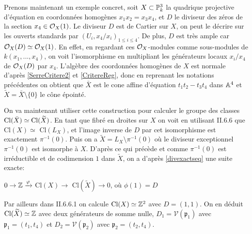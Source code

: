 Prenons maintenant un exemple concret, soit $X\subset \mathbb{P}^3_k$ la quadrique projective d'équation en coordonnées homogènes $x_1x_2=x_3x_4$, et $D$ le diviseur des zéros de la section $x_4\in\mathcal{O}_X(1)$. Le diviseur $D$ est de Cartier sur $X$, on peut le décrire sur les ouverts standards par $(U_i, x_4/x_i)_{1\leq i\leq 4}$. De plus, $D$ est très ample car $\mathcal{O}_X(D)\simeq \mathcal{O}_X(1)$. En effet, en regardant ces $\mathcal{O}_X$-modules comme sous-modules de $k(x_1,...,x_4)$, on voit l'isomorphisme en multipliant les générateurs locaux $x_i/x_4$ de $\mathcal{O}_X(D)$ par $x_4$. L'algèbre des coordonnées homogènes de $X$ est normale d'après \ref{SerreCritere2} et \ref{CritereReg}, donc en reprenant les notations précédentes on obtient que $\bar{X}$ est le cone affine d'équation $t_1t_2-t_3t_4$ dans $\mathbb{A}^4$ et $\widetilde{X}=\bar{X}\setminus\lbrace 0 \rbrace$ le cône épointé. 

On va maintenant utiliser cette construction pour calculer le groupe des classes $\operatorname{Cl}(\bar{X})\simeq \operatorname{Cl}(\widetilde{X})$. En tant que fibré en droites sur $X$ on voit en utilisant \cite{Hartshorne} II.6.6 que Cl$(X)\simeq$ Cl$(L_X)$, et l'image inverse de $D$ par cet isomorphisme est exactement $\pi^{-1}(0)$. Puis on a $\widetilde{X}=L_X \setminus \pi^{-1}(0)$ où le diviseur exceptionnel $\pi^{-1}(0)$ est isomorphe à $X$. D'après ce qui précède et comme $\pi^{-1}(0)$ est irréductible et de codimension $1$ dans $\widetilde{X}$, on a d'après \ref{divexactseq} une suite exacte:
\begin{center}
$ 0\rightarrow\mathbb{Z}\xrightarrow{\varphi}$ Cl$(X) \rightarrow$ Cl$(\widetilde{X}) \rightarrow 0$, où $\phi(1)=D$
\end{center}
Par ailleurs dans \cite{Hartshorne} II.6.6.1 on calcule $\operatorname{Cl}(X)\simeq \mathbb{Z}^2$ avec $D=(1,1)$. On en déduit $\operatorname{Cl}(\widetilde{X})\simeq \mathbb{Z}$ avec deux générateurs de somme nulle, $D_1=\mathcal{V}(\mathfrak{p}_1)$ avec $\mathfrak{p}_1=(t_1,t_4)$ et $D_2=\mathcal{V}(\mathfrak{p}_2)$ avec $\mathfrak{p}_2=(t_2,t_4)$.

